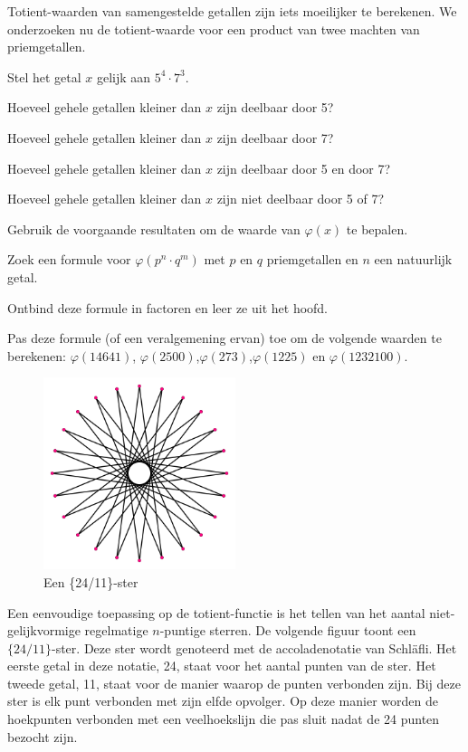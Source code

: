 Totient-waarden van samengestelde getallen zijn iets moeilijker te berekenen. We onderzoeken nu de totient-waarde voor een product van twee machten van priemgetallen.

\begin{oef} Stel het getal $x$ gelijk aan $5^4 \cdot 7^3$.

\begin{enumoef}
\item Hoeveel gehele getallen kleiner dan $x$ zijn deelbaar door 5? 
\item Hoeveel gehele getallen kleiner dan $x$ zijn deelbaar door 7? 
\item Hoeveel gehele getallen kleiner dan $x$ zijn deelbaar door 5 en door 7? 
\item Hoeveel gehele getallen kleiner dan $x$ zijn niet deelbaar door 5 of 7? 
\item Gebruik de voorgaande resultaten om de waarde van $\varphi(x)$ te bepalen.
\item Zoek een formule voor $\varphi(p^n \cdot q^m)$ met $p$ en $q$ priemgetallen en $n$ een natuurlijk getal.
\item Ontbind deze formule in factoren en leer ze uit het hoofd.
\item Pas deze formule (of een veralgemening ervan) toe om de volgende waarden te berekenen: $\varphi(14641)$, $\varphi(2500)$,$\varphi(273)$,$\varphi(1225)$ en $\varphi(1232100)$.
\end{enumoef}
\end{oef}

\begin{figure} [h]
\label{vierentwintigpuntig}
\centering
\includegraphics[width=0.5\textwidth]{24puntigester.png}
\caption{Een \{24/11\}-ster}
\end{figure}
  
Een eenvoudige toepassing op de totient-functie is het tellen van het aantal niet-gelijkvormige regelmatige $n$-puntige sterren. De volgende figuur toont een $\{24/11\}$-ster. Deze ster wordt genoteerd met de accoladenotatie van Schläfli. Het eerste getal in deze notatie, 24, staat voor het aantal punten van de ster. Het tweede getal, 11, staat voor de manier waarop de punten verbonden zijn. Bij deze ster is elk punt verbonden met zijn elfde opvolger. Op deze manier worden de hoekpunten verbonden met een veelhoekslijn die pas sluit nadat de 24 punten bezocht zijn.

